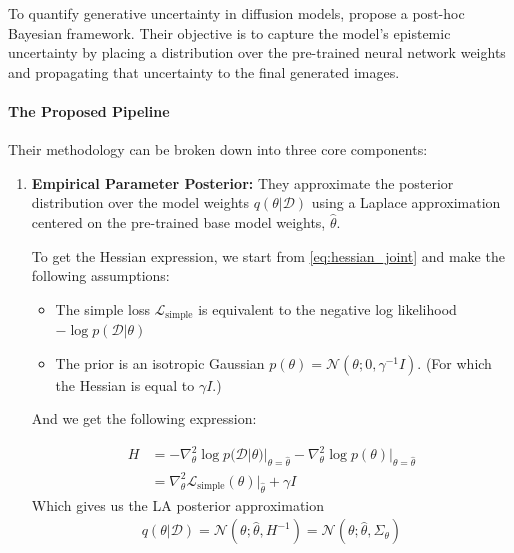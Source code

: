 To quantify generative uncertainty in diffusion models, \parencite{jazbec_generative_2025} propose a post-hoc Bayesian framework. Their objective is to capture the model's epistemic uncertainty by placing a distribution over the pre-trained neural network weights and propagating that uncertainty to the final generated images.

\paragraph{The Proposed Pipeline}
Their methodology can be broken down into three core components:

\begin{enumerate}
    \item \textbf{Empirical Parameter Posterior:} They approximate the posterior distribution over the model weights $q(\theta | \mathcal{D})$ using a Laplace approximation centered on the pre-trained base model weights, $\hat{\theta}$. 
    

    To get the Hessian expression, we start from \autoref{eq:hessian_joint} and make the following assumptions:
    \begin{itemize}
        \item The simple loss $\mathcal{L}_{\mathrm{simple}}$ is equivalent to the negative log likelihood $-\log p(\mathcal{D}|\theta)$
        \item The prior is an isotropic Gaussian $p(\theta) = \mathcal{N}(\theta; 0, \gamma^{-1}I)$. (For which the Hessian is equal to $\gamma I$.)
    \end{itemize}
    And we get the following expression:
    
    \begin{align}
    H &= -\nabla^2_\theta \log p(\mathcal{D}|\theta)|_{\theta=\hat\theta} -\nabla^2_\theta \log p(\theta)|_{\theta=\hat\theta}\\
    &= \nabla_{\theta}^{2}\mathcal{L}_{\mathrm{simple}}(\theta)|_{\hat{\theta}} + \gamma I \label{eq:jazbec_laplace}
    \end{align}
    Which gives us the \acs{LA} posterior approximation 
    \begin{align}
    q(\theta | \mathcal{D}) = \mathcal{N}(\theta; \hat{\theta}, H^{-1}) = \mathcal{N}(\theta;\hat\theta,\Sigma_\theta)
    \end{align}
    

\end{enumerate}
